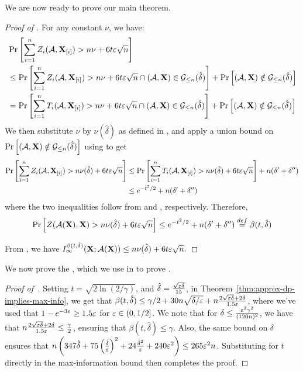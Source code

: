 We are now ready to prove our main theorem.
\begin{proof}[Proof of ]
For any constant $\nu$, we have:
\begin{align*}
& \Prob{}{\sum\limits_{i=1}^n Z_i(\cA,\bX_{[i]})  > n\nu + 6t\eps\sqrt{n}} \\%
& \leq \Prob{}{\sum\limits_{i=1}^n Z_i(\cA,\bX_{[i]}) > n\nu + 6t\eps\sqrt{n} \cap (\cA,\bX) \in \cG_{\leq n}(\hat\delta)}+ \Prob{}{(\cA,\bX) \notin \cG_{\leq n}(\hat\delta)} \\
& =  \Prob{}{\sum\limits_{i=1}^n T_i(\cA,\bX_{[i]}) > n\nu + 6t\eps\sqrt{n} \cap (\cA,\bX) \in  \cG_{\leq n}(\hat\delta) } + \Prob{}{(\cA,\bX) \notin  \cG_{\leq n}(\hat\delta)}
\end{align*}
We then substitute $\nu$ by $\nu(\hat\delta)$ as defined in , and apply a union bound on $\mathrm{Pr}\left[(\mathcal{A},\mathbf{X}) \notin  \mathcal{G}_{\leq n}(\hat\delta)\right]$ using  to get
\begin{align*}
 \operatorname*{\mathrm{Pr}}_{}\left[\sum\limits_{i=1}^n Z_i(\mathcal{A},\mathbf{X}_{[i]})  > n\nu(\hat\delta) + 6t\varepsilon\sqrt{n}\right] & \leq \operatorname*{\mathrm{Pr}}_{}\left[\sum\limits_{i=1}^n T_i(\mathcal{A},\mathbf{X}_{[i]}) > n\nu(\hat\delta) + 6t\varepsilon\sqrt{n}  \right] + n(\delta' + \delta'') \\
&   \leq e^{-t^2/2} + n(\delta' + \delta'')
\end{align*}
where the two inequalities follow from  and , respectively.  Therefore,
\begin{align*}
\operatorname*{\mathrm{Pr}}_{ }\left[Z(\mathcal{A}(\mathbf{X}),\mathbf{X}) > n\nu(\hat\delta) + 6t\varepsilon\sqrt{n}\right] \leq e^{-t^2/2} + n(\delta' + \delta'')  \stackrel{def}{=} \beta(t,\hat\delta)
\end{align*}

From , we have
$I^{\beta(t,\hat\delta)}_\infty(\mathbf{X};\mathcal{A}(\mathbf{X})) \leq n\nu(\hat\delta)
+ 6t\varepsilon\sqrt{n}.$  

\end{proof}

\noindent
We now prove the , which we use in  to prove .

\begin{proof}[Proof of~]
    Setting $t = \sqrt{2 \ln(2/\gamma)}$, and $\hat{\delta} = \frac{\sqrt{\varepsilon \delta}}{15}$, in Theorem~\ref{thm:approx-dp-implies-max-info}, we get that $\beta(t,\hat{\delta}) \leq \gamma/2 + 30n\sqrt{\delta/\varepsilon} + n\frac{2\sqrt{\varepsilon \delta}+2\delta}{1.5\varepsilon}$, where we've used that $1-e^{-3\varepsilon} \geq 1.5\varepsilon$ for $\varepsilon \in (0,1/2]$. We note that for $\delta \leq \frac{\varepsilon^2\gamma^2}{(120n)^2}$, we have that $n\frac{2\sqrt{\varepsilon \delta}+2\delta}{1.5\varepsilon} \leq \frac{\gamma}{2}$, ensuring that $\beta(t,\hat{\delta}) \leq \gamma$. Also, the same bound on $\delta$ ensures that $n\left( 347\hat{\delta} + 75 \left(\frac{\hat{\delta}}{\varepsilon} \right)^2 + 24\frac{\hat{\delta}^2}{\varepsilon}+ 240\varepsilon^2\right) \leq   265\varepsilon^2n$. Substituting for $t$ directly in the max-information bound then completes the proof. 
\end{proof}
